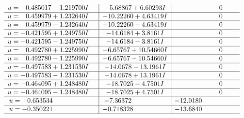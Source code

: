 \documentclass[1p]{elsarticle_modified}
\theoremstyle{definition}
\begin{document}
$$\begin{array}{c|c|c}
\begin{aligned}
u &= -0.485017 - 1.219700 I\end{aligned}
 & -5.68867 + 6.60293 I & \phantom{-0.000000 } 0 \\ \hline\begin{aligned}
u &= \phantom{-}0.459979 + 1.232640 I\end{aligned}
 & -10.22260 + 4.63419 I & \phantom{-0.000000 } 0 \\ \hline\begin{aligned}
u &= \phantom{-}0.459979 - 1.232640 I\end{aligned}
 & -10.22260 - 4.63419 I & \phantom{-0.000000 } 0 \\ \hline\begin{aligned}
u &= -0.421595 + 1.249750 I\end{aligned}
 & -14.6184 + 3.8161 I & \phantom{-0.000000 } 0 \\ \hline\begin{aligned}
u &= -0.421595 - 1.249750 I\end{aligned}
 & -14.6184 - 3.8161 I & \phantom{-0.000000 } 0 \\ \hline\begin{aligned}
u &= \phantom{-}0.492780 + 1.225990 I\end{aligned}
 & -6.65767 + 10.54660 I & \phantom{-0.000000 } 0 \\ \hline\begin{aligned}
u &= \phantom{-}0.492780 - 1.225990 I\end{aligned}
 & -6.65767 - 10.54660 I & \phantom{-0.000000 } 0 \\ \hline\begin{aligned}
u &= -0.497583 + 1.231530 I\end{aligned}
 & -14.0678 - 13.1961 I & \phantom{-0.000000 } 0 \\ \hline\begin{aligned}
u &= -0.497583 - 1.231530 I\end{aligned}
 & -14.0678 + 13.1961 I & \phantom{-0.000000 } 0 \\ \hline\begin{aligned}
u &= -0.464095 + 1.248480 I\end{aligned}
 & -18.7025 - 4.7501 I & \phantom{-0.000000 } 0 \\ \hline\begin{aligned}
u &= -0.464095 - 1.248480 I\end{aligned}
 & -18.7025 + 4.7501 I & \phantom{-0.000000 } 0 \\ \hline\begin{aligned}
u &= \phantom{-}0.653534\phantom{ +0.000000I}\end{aligned}
 & -7.36372\phantom{ +0.000000I} & -12.0180\phantom{ +0.000000I} \\ \hline\begin{aligned}
u &= -0.350221\phantom{ +0.000000I}\end{aligned}
 & -0.718328\phantom{ +0.000000I} & -13.6840\phantom{ +0.000000I}\\
 \hline 
 \end{array}$$\newpage
\end{document}
